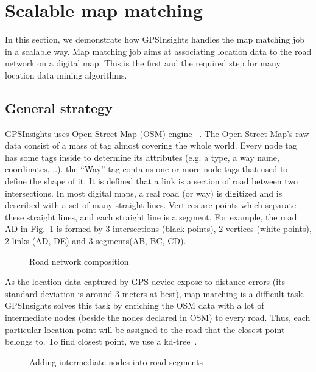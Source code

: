 \documentclass{sig-alternate-05-2015}
\begin{document}
\section{Scalable map matching}

In this section, we demonstrate how GPSInsights handles the map matching job in a scalable way. Map matching job aims at associating location data to the road network on a digital map. This is the first and the required step for many location data mining algorithms. 
	
\subsection{General strategy} \label{ssec:links}

GPSInsights uses Open Street Map (OSM) engine ~\cite{openstreetmap}. The Open Street Map's raw data consist of a mass of tag almost covering the whole world. Every node tag has some tags inside to determine its attributes (e.g. a type, a way name, coordinates, ..). the ``Way'' tag contains one or more node tags that used to define the shape of it. It is defined that a link is a section of road between two intersections. In most digital maps, a real road (or way) is digitized and is described with a set of many straight lines. Vertices are points which separate these straight lines, and each straight line is a segment. For example, the road AD in Fig.~\ref{fig:composition} is formed by 3 intersections (black points), 2 vertices (white points), 2 links (AD, DE) and 3 segments(AB, BC, CD).
		
\begin{figure}[h]
\centering
{}
\caption{Road network composition}
\label{fig:composition}
\end{figure}
	
As the location data captured by GPS device expose to distance errors (its standard deviation is around 3 meters at best), map matching is a difficult task. GPSInsights solves this task by enriching the OSM data with a lot of intermediate nodes (beside the nodes declared in OSM) to every road. Thus, each particular location point will be assigned to the road that the closest point belongs to. To find closest point, we use a kd-tree~\cite{moh2013approximate}. 

	
\begin{figure}[h]
\centering
{}
\caption{Adding intermediate nodes into road segments}
\label{fig:addPointsToRoad}
\end{figure}
	
\end{document}
